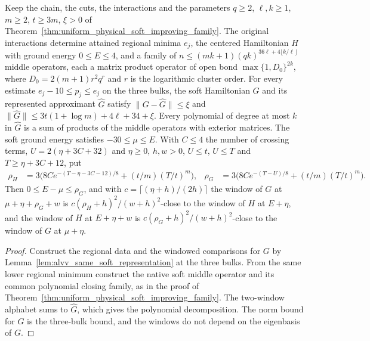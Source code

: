 \begin{lemma}
    \label{lem:soft_low_density_polynomial_core}
    \leanok

    Keep the chain, the cuts, the interactions and the parameters $q\geq2$,
    $\ell,k\geq1$, $m\geq2$, $t\geq3m$, $\xi>0$ of
    Theorem~\ref{thm:uniform_physical_soft_improving_family}. The original
    interactions determine attained regional minima $e_j$, the centered
    Hamiltonian $H$ with ground energy $0\leq E\leq4$, and a family of
    $n\leq(mk+1)(qk)^{36\ell+4\lfloor k/\ell\rfloor}$ middle operators, each a
    matrix product operator of open bond $\max\{1,D_0\}^{2k}$, where
    $D_0=2(m+1)r^2q^r$ and $r$ is the logarithmic cluster order. For every
    estimate $e_j-10\leq p_j\leq e_j$ on the three bulks, the soft
    Hamiltonian $G$ and its represented approximant $\widehat G$ satisfy
    $\|G-\widehat G\|\leq\xi$ and $\|\widehat G\|\leq3t(1+\log m)+4\ell+34+\xi$.
    Every polynomial of degree at most $k$ in $\widehat G$ is a sum of
    products of the middle operators with exterior matrices. The soft ground
    energy satisfies $-30\leq\mu\leq E$. With $C\leq4$ the number of crossing
    terms, $U=2(\eta+3C+32)$ and $\eta\ge0$, $h,w>0$, $U\leq t$, $U\leq T$
    and $T\ge\eta+3C+12$, put
    \begin{align}
        \rho_H & =3\bigl(8Ce^{-(T-\eta-3C-12)/8}+(t/m)(T/t)^m\bigr), &
        \rho_G & =3\bigl(8Ce^{-(T-U)/8}+(t/m)(T/t)^m\bigr).
    \end{align}
    Then $0\leq E-\mu\leq\rho_G$, and with $c=\lceil(\eta+h)/(2h)\rceil$ the
    window of $G$ at $\mu+\eta+\rho_G+w$ is
    $c(\rho_H+h)^2/(w+h)^2$-close to the window of $H$ at $E+\eta$, and the
    window of $H$ at $E+\eta+w$ is $c(\rho_G+h)^2/(w+h)^2$-close to the window
    of $G$ at $\mu+\eta$.
\end{lemma}
\begin{proof}\leanok
    Construct the regional data and the windowed comparisons for $G$ by
    Lemma~\ref{lem:alvv_same_soft_representation} at the three bulks. From
    the same lower regional minimum construct the native soft middle operator
    and its common polynomial closing family, as in the proof of
    Theorem~\ref{thm:uniform_physical_soft_improving_family}. The two-window
    alphabet sums to $\widehat G$, which gives the polynomial decomposition.
    The norm bound for $G$ is the three-bulk bound, and the windows do not
    depend on the eigenbasis of $G$.
\end{proof}


